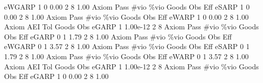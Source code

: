       eWGARP {\VBAR}    1           0        0.00           2           8        1.00  
{\smallskip}
{\smallskip}
{\smallskip}
       Axiom {\VBAR} Pass        \#vio        \%vio       Goods         Obs         Eff  
       eSARP {\VBAR}    1           0        0.00           2           8        1.00  
{\smallskip}
{\smallskip}
{\smallskip}
       Axiom {\VBAR} Pass        \#vio        \%vio       Goods         Obs         Eff  
       eWARP {\VBAR}    1           0        0.00           2           8        1.00  
{\smallskip}
       Axiom {\VBAR}       AEI        Tol      Goods        Obs 
       eGARP {\VBAR}         1   1.00e-12          2          8 
{\smallskip}
{\smallskip}
{\smallskip}
       Axiom {\VBAR} Pass        \#vio        \%vio       Goods         Obs         Eff  
       eGARP {\VBAR}    0           1        1.79           2           8        1.00  
{\smallskip}
{\smallskip}
{\smallskip}
       Axiom {\VBAR} Pass        \#vio        \%vio       Goods         Obs         Eff  
      eWGARP {\VBAR}    0           1        3.57           2           8        1.00  
{\smallskip}
{\smallskip}
{\smallskip}
       Axiom {\VBAR} Pass        \#vio        \%vio       Goods         Obs         Eff  
       eSARP {\VBAR}    0           1        1.79           2           8        1.00  
{\smallskip}
{\smallskip}
{\smallskip}
       Axiom {\VBAR} Pass        \#vio        \%vio       Goods         Obs         Eff  
       eWARP {\VBAR}    0           1        3.57           2           8        1.00  
{\smallskip}
       Axiom {\VBAR}       AEI        Tol      Goods        Obs 
       eGARP {\VBAR}         1   1.00e-12          2          8 
{\smallskip}
{\smallskip}
{\smallskip}
       Axiom {\VBAR} Pass        \#vio        \%vio       Goods         Obs         Eff  
       eGARP {\VBAR}    1           0        0.00           2           8        1.00  
{\smallskip}
